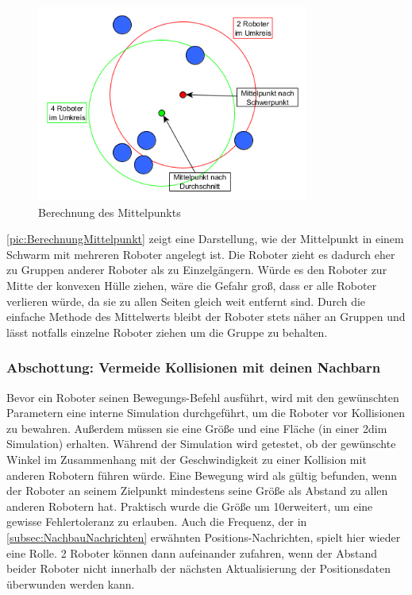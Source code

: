 \begin{figure}[h]
	\centering
	\includegraphics[width=0.8\textwidth,keepaspectratio]{graphics/SchwarmMittelpunktBerechnung.png}
	\caption{Berechnung des Mittelpunkts}
	\label{pic:BerechnungMittelpunkt}
\end{figure}

\autoref{pic:BerechnungMittelpunkt} zeigt eine Darstellung, wie der Mittelpunkt in einem Schwarm mit mehreren Roboter angelegt ist.
Die Roboter zieht es dadurch eher zu Gruppen anderer Roboter als zu Einzelgängern. Würde es den Roboter zur Mitte der konvexen Hülle ziehen, wäre die Gefahr groß, dass er alle Roboter verlieren würde, da sie zu allen Seiten gleich weit entfernt sind. Durch die einfache Methode des Mittelwerts bleibt der Roboter stets näher an Gruppen und lässt notfalls einzelne Roboter ziehen um die Gruppe zu behalten.

\subsubsection*{Abschottung: Vermeide Kollisionen mit deinen Nachbarn}

Bevor ein Roboter seinen Bewegungs-Befehl ausführt, wird mit den gewünschten Parametern eine interne Simulation durchgeführt, um die Roboter vor Kollisionen zu bewahren. Außerdem müssen sie eine Größe und eine Fläche (in einer 2dim Simulation) erhalten. Während der Simulation wird getestet, ob der gewünschte Winkel im Zusammenhang mit der Geschwindigkeit zu einer Kollision mit anderen Robotern führen würde. Eine Bewegung wird als gültig befunden, wenn der Roboter an seinem Zielpunkt mindestens seine Größe als Abstand zu allen anderen Robotern hat. Praktisch wurde die Größe um 10\per erweitert, um eine gewisse Fehlertoleranz zu erlauben.
Auch die Frequenz, der in \autoref{subsec:NachbauNachrichten} erwähnten Positions-Nachrichten, spielt hier wieder eine Rolle. 2 Roboter können dann aufeinander zufahren, wenn der Abstand beider Roboter nicht innerhalb der nächsten Aktualisierung der Positionsdaten überwunden werden kann.


